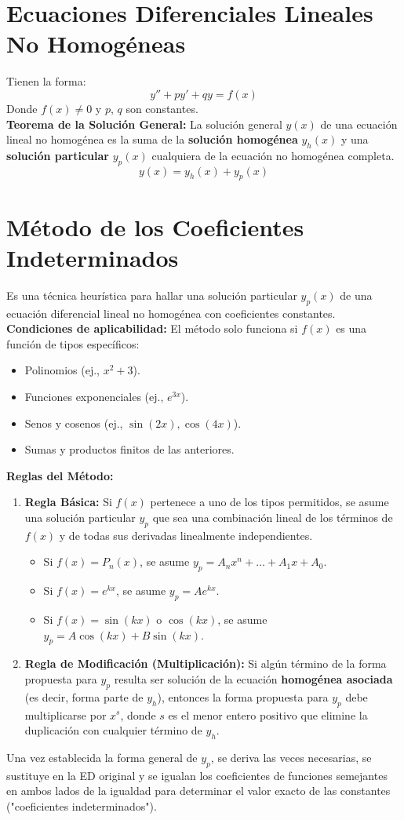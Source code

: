 \documentclass[a4paper,12pt]{article}
\begin{document}
\section{Ecuaciones Diferenciales Lineales No Homogéneas}
Tienen la forma:
$$ y'' + py' + qy = f(x)$$
Donde $f(x) \neq 0$ y $p$, $q$ son constantes.
\\[5mm]
\textbf{Teorema de la Solución General:}
La solución general $y(x)$ de una ecuación lineal no homogénea es la suma de la \textbf{solución homogénea} $y_h(x)$ y una \textbf{solución particular} $y_p(x)$ cualquiera de la ecuación no homogénea completa.
$$ y(x) = y_h(x) + y_p(x) $$

\section{Método de los Coeficientes Indeterminados}
Es una técnica heurística para hallar una solución particular $y_p(x)$ de una ecuación diferencial lineal no homogénea con coeficientes constantes.
\\[5mm]
\textbf{Condiciones de aplicabilidad:}
El método solo funciona si $f(x)$ es una función de tipos específicos:
\begin{itemize}
    \item Polinomios (ej., $x^2 + 3$).
    \item Funciones exponenciales (ej., $e^{3x}$).
    \item Senos y cosenos (ej., $\sin(2x), \cos(4x)$).
    \item Sumas y productos finitos de las anteriores.
\end{itemize}

\textbf{Reglas del Método:}
\begin{enumerate}
    \item \textbf{Regla Básica:} Si $f(x)$ pertenece a uno de los tipos permitidos, se asume una solución particular $y_p$ que sea una combinación lineal de los términos de $f(x)$ y de todas sus derivadas linealmente independientes.
    \begin{itemize}
        \item Si $f(x) = P_n(x)$, se asume $y_p = A_nx^n + \dots + A_1x + A_0$.
        \item Si $f(x) = e^{kx}$, se asume $y_p = A e^{kx}$.
        \item Si $f(x) = \sin(kx)$ o $\cos(kx)$, se asume $y_p = A\cos(kx) + B\sin(kx)$.
    \end{itemize}
    \item \textbf{Regla de Modificación (Multiplicación):} Si algún término de la forma propuesta para $y_p$ resulta ser solución de la ecuación \textbf{homogénea asociada} (es decir, forma parte de $y_h$), entonces la forma propuesta para $y_p$ debe multiplicarse por $x^s$, donde $s$ es el menor entero positivo que elimine la duplicación con cualquier término de $y_h$.
\end{enumerate}
Una vez establecida la forma general de $y_p$, se deriva las veces necesarias, se sustituye en la ED original y se igualan los coeficientes de funciones semejantes en ambos lados de la igualdad para determinar el valor exacto de las constantes ("coeficientes indeterminados").
\end{document}
